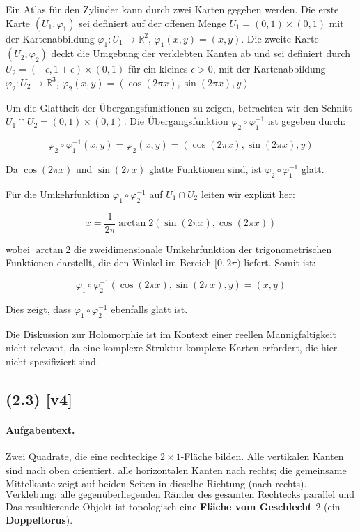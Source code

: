 \documentclass[11pt,a4paper]{article}
\begin{document}
Ein Atlas für den Zylinder kann durch zwei Karten gegeben werden. Die erste Karte \((U_1, \varphi_1)\) sei definiert auf der offenen Menge \(U_1 = (0,1) \times (0,1)\) mit der Kartenabbildung \(\varphi_1: U_1 \to \mathbb{R}^2\), \(\varphi_1(x,y) = (x,y)\). Die zweite Karte \((U_2, \varphi_2)\) deckt die Umgebung der verklebten Kanten ab und sei definiert durch \(U_2 = (-\epsilon, 1+\epsilon) \times (0,1)\) für ein kleines \(\epsilon > 0\), mit der Kartenabbildung \(\varphi_2: U_2 \to \mathbb{R}^3\), \(\varphi_2(x,y) = (\cos(2\pi x), \sin(2\pi x), y)\).

Um die Glattheit der Übergangsfunktionen zu zeigen, betrachten wir den Schnitt \(U_1 \cap U_2 = (0,1) \times (0,1)\). Die Übergangsfunktion \(\varphi_2 \circ \varphi_1^{-1}\) ist gegeben durch:

\[
\varphi_2 \circ \varphi_1^{-1}(x,y) = \varphi_2(x,y) = (\cos(2\pi x), \sin(2\pi x), y)
\]

Da \(\cos(2\pi x)\) und \(\sin(2\pi x)\) glatte Funktionen sind, ist \(\varphi_2 \circ \varphi_1^{-1}\) glatt.

Für die Umkehrfunktion \(\varphi_1 \circ \varphi_2^{-1}\) auf \(U_1 \cap U_2\) leiten wir explizit her:

\[
x = \frac{1}{2\pi} \arctan2(\sin(2\pi x), \cos(2\pi x))
\]

wobei \(\arctan2\) die zweidimensionale Umkehrfunktion der trigonometrischen Funktionen darstellt, die den Winkel im Bereich \([0, 2\pi)\) liefert. Somit ist:

\[
\varphi_1 \circ \varphi_2^{-1}(\cos(2\pi x), \sin(2\pi x), y) = (x, y)
\]

Dies zeigt, dass \(\varphi_1 \circ \varphi_2^{-1}\) ebenfalls glatt ist.

Die Diskussion zur Holomorphie ist im Kontext einer reellen Mannigfaltigkeit nicht relevant, da eine komplexe Struktur komplexe Karten erfordert, die hier nicht spezifiziert sind.


\subsection*{(2.3) [v4]}
\paragraph{Aufgabentext.}
Zwei Quadrate, die eine rechteckige $2\times1$-Fläche bilden.  
Alle vertikalen Kanten sind nach oben orientiert, 
alle horizontalen Kanten nach rechts; 
die gemeinsame Mittelkante zeigt auf beiden Seiten in dieselbe Richtung (nach rechts).  
\[
\text{Verklebung: alle gegenüberliegenden Ränder des gesamten Rechtecks parallel und gleich orientiert.}
\]
Das resultierende Objekt ist topologisch eine \textbf{Fläche vom Geschlecht $2$} (ein \textbf{Doppeltorus}).
\end{document}
